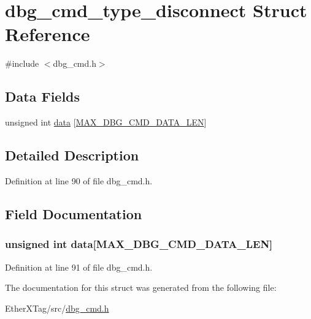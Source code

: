 \hypertarget{structdbg__cmd__type__disconnect}{\section{dbg\-\_\-cmd\-\_\-type\-\_\-disconnect Struct Reference}
\label{structdbg__cmd__type__disconnect}
}


{\ttfamily \#include $<$dbg\-\_\-cmd.\-h$>$}

\subsection*{Data Fields}
\begin{DoxyCompactItemize}
\item 
unsigned int \hyperlink{structdbg__cmd__type__disconnect_abf020699b43e0c558a6fdf56f12b92ec}{data} \mbox{[}\hyperlink{dbg__cmd_8h_a4552ec15033c8a68870cdf80eda5470c}{M\-A\-X\-\_\-\-D\-B\-G\-\_\-\-C\-M\-D\-\_\-\-D\-A\-T\-A\-\_\-\-L\-E\-N}\mbox{]}
\end{DoxyCompactItemize}


\subsection{Detailed Description}


Definition at line 90 of file dbg\-\_\-cmd.\-h.



\subsection{Field Documentation}
\hypertarget{structdbg__cmd__type__disconnect_abf020699b43e0c558a6fdf56f12b92ec}{
\subsubsection[{data}]{\setlength{\rightskip}{0pt plus 5cm}unsigned int data\mbox{[}{\bf M\-A\-X\-\_\-\-D\-B\-G\-\_\-\-C\-M\-D\-\_\-\-D\-A\-T\-A\-\_\-\-L\-E\-N}\mbox{]}}}\label{structdbg__cmd__type__disconnect_abf020699b43e0c558a6fdf56f12b92ec}


Definition at line 91 of file dbg\-\_\-cmd.\-h.



The documentation for this struct was generated from the following file\-:\begin{DoxyCompactItemize}
\item 
Ether\-X\-Tag/src/\hyperlink{dbg__cmd_8h}{dbg\-\_\-cmd.\-h}\end{DoxyCompactItemize}
